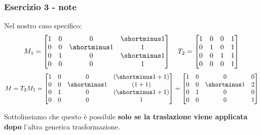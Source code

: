 \documentclass{beamer}
\begin{document}
\begin{frame}
\frametitle{Esercizio 3 - note}
Nel nostro caso specifico:
\begin{displaymath}
   M_1 = 
\begin{bmatrix}
    1 & 0 &  0 & \shortminus 1 \\
    0 & 0 & \shortminus 1 &  1 \\
    0 & 1 &  0 & \shortminus 1 \\ 
    0 & 0 &  0 &  1
\end{bmatrix}
\quad
T_2 = 
\begin{bmatrix}
        1 & 0 & 0 & 1\\
        0 & 1 & 0 & 1\\
        0 & 0 & 1 & 1\\
        0 & 0 & 0 & 1 
\end{bmatrix}
\end{displaymath}
\begin{displaymath}
M    
    =
    T_2 M_1
    =
\begin{bmatrix}
    1 & 0 &  0 & (\shortminus 1 + 1) \\
    0 & 0 & \shortminus 1 & (1 + 1) \\
    0 & 1 &  0 & (\shortminus 1 + 1) \\ 
    0 & 0 &  0 &  1
\end{bmatrix}
   = 
\begin{bmatrix}
    1 & 0 &  0 &  0 \\
    0 & 0 & \shortminus 1 &  2 \\
    0 & 1 &  0 &  0 \\ 
    0 & 0 &  0 &  1
\end{bmatrix}
\end{displaymath}

Sottolineiamo che questo \`e possibile \textbf{solo se la traslazione viene applicata dopo} l'altra generica trasformazione.
\end{frame}
\end{document}
